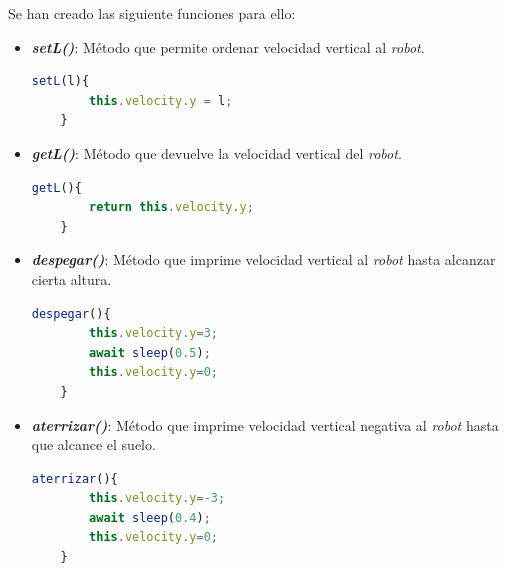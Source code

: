 Se han creado las siguiente funciones para ello:
\begin{itemize}
    \item \textit{\textbf{setL()}}: Método que permite ordenar velocidad vertical al \textit{robot}. 
    
    \begin{lstlisting}[language=javascript]
    setL(l){
        this.velocity.y = l;
    }
    \end{lstlisting}
    
    \item \textit{\textbf{getL()}}: Método que devuelve la velocidad vertical del \textit{robot}.
    
    \begin{lstlisting}[language=javascript]
    getL(){
        return this.velocity.y;
    }
    \end{lstlisting}
    
    \item \textit{\textit{\textbf{despegar()}}}: Método que imprime velocidad vertical al \textit{robot} hasta alcanzar cierta altura.
    
    \begin{lstlisting}[language=javascript]
    despegar(){
        this.velocity.y=3; 
        await sleep(0.5);
        this.velocity.y=0;
    }
    \end{lstlisting}
    
    \item \textit{\textbf{aterrizar()}}: Método que imprime velocidad vertical negativa al \textit{robot} hasta que alcance el suelo.
    
    \begin{lstlisting}[language=javascript]
    aterrizar(){
        this.velocity.y=-3;
        await sleep(0.4);
        this.velocity.y=0;
    }
    \end{lstlisting}
    
\end{itemize}

